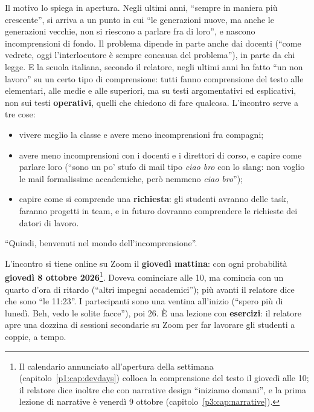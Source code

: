 Il motivo lo spiega in apertura. Negli ultimi anni, ``sempre in maniera più
crescente'', si arriva a un punto in cui ``le generazioni nuove, ma anche le
generazioni vecchie, non si riescono a parlare fra di loro'', e nascono
incomprensioni di fondo. Il problema dipende in parte anche dai docenti
(``come vedrete, oggi l'interlocutore è sempre concausa del problema''), in
parte da chi legge. E la scuola italiana, secondo il relatore, negli ultimi
anni ha fatto ``un non lavoro'' su un certo tipo di comprensione: tutti fanno
comprensione del testo alle elementari, alle medie e alle superiori, ma su
testi argomentativi ed esplicativi, non sui testi \textbf{operativi}, quelli
che chiedono di fare qualcosa. L'incontro serve a tre cose:
\begin{itemize}
  \item vivere meglio la classe e avere meno incomprensioni fra compagni;
  \item avere meno incomprensioni con i docenti e i direttori di corso, e capire
        come parlare loro (``sono un po' stufo di mail tipo \emph{ciao bro}
        con lo slang: non voglio le mail formalissime accademiche, però
        nemmeno \emph{ciao bro}'');
  \item capire come si comprende una \textbf{richiesta}: gli studenti avranno
        delle task, faranno progetti in team, e in futuro dovranno comprendere
        le richieste dei datori di lavoro.
\end{itemize}
``Quindi, benvenuti nel mondo dell'incomprensione''.

L'incontro si tiene online su Zoom il \textbf{giovedì mattina}: con ogni
probabilità \textbf{giovedì 8 ottobre 2026}\footnote{Il calendario annunciato
all'apertura della settimana (capitolo~\ref{p1:cap:devdays}) colloca la
comprensione del testo il giovedì alle 10; il relatore dice inoltre che con
narrative design ``iniziamo domani'', e la prima lezione di narrative è
venerdì 9 ottobre (capitolo~\ref{p3:cap:narrative}).}. Doveva cominciare alle
10, ma comincia con un quarto d'ora di ritardo (``altri impegni accademici'');
più avanti il relatore dice che sono ``le 11:23''. I partecipanti sono una
ventina all'inizio (``spero più di lunedì. Beh, vedo le solite facce''), poi
26. È una lezione con \textbf{esercizi}: il relatore apre una dozzina di
sessioni secondarie su Zoom per far lavorare gli studenti a coppie, a tempo.

